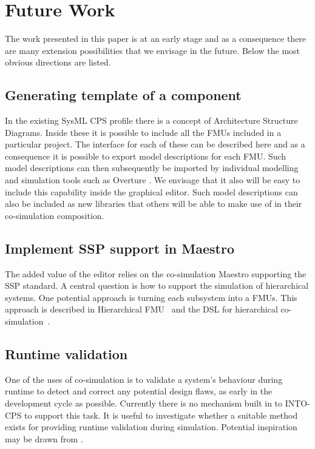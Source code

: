 \section{Future Work}\label{sec:future}

The work presented in this paper is at an early stage and as a consequence there are many extension possibilities that we envisage in the future. Below the most obvious directions are listed.

\subsection{Generating template of a component}

In the existing SysML CPS profile there is a concept of Architecture Structure Diagrams. Inside these it is possible to include all the FMUs included in a particular project. The interface for each of these can be described here and as a consequence it is possible to export model descriptions for each FMU. Such model descriptions can then subsequently be imported by individual modelling and simulation tools such as Overture \cite{Larsen&10a}. We envisage that it also will be easy to include this capability inside the graphical editor. Such model descriptions can also be included as new libraries that others will be able to make use of in their co-simulation composition.

\subsection{Implement SSP support in Maestro}
The added value of the editor relies on the co-simulation Maestro supporting the SSP standard.
A central question is how to support the simulation of hierarchical systems.
One potential approach is turning each subsystem into a FMUs. This approach is described in Hierarchical FMU~\cite{Thule&19} and the DSL for hierarchical co-simulation~\cite{Gomes&18a}.

\subsection{Runtime validation}
One of the uses of co-simulation is to validate a system's behaviour during runtime to detect and correct any potential design flaws, as early in the development cycle as possible.
Currently there is no mechanism built in to INTO-CPS to support this task.
It is useful to investigate whether a suitable method exists for providing runtime validation during simulation.
Potential inspiration may be drawn from \cite{Havelund&04}.


